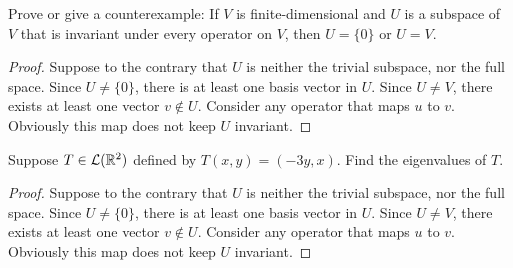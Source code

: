 \begin{problem}{4}
Prove or give a counterexample: If $V$ is finite-dimensional and $U$ is a subspace of $V$ that is invariant under every
operator on $V$, then $U = \{0\}$ or $U = V$.
\end{problem}
\begin{proof}
Suppose to the contrary that $U$ is neither the trivial subspace, nor the full space. Since $U \neq \{0\}$, there is at 
least one basis vector in $U$. Since $U \neq V$, there exists at least one vector $v \notin U$. Consider any operator that 
maps $u$ to $v$. Obviously this map does not keep $U$ invariant. 
\end{proof}

\begin{problem}{5}
Suppose $T\in\mathcal{L}(\mathbb{R}^2)$ defined by $T(x, y) = (-3y, x)$. Find the eigenvalues of $T$.
\end{problem}
\begin{proof}
Suppose to the contrary that $U$ is neither the trivial subspace, nor the full space. Since $U \neq \{0\}$, there is at 
least one basis vector in $U$. Since $U \neq V$, there exists at least one vector $v \notin U$. Consider any operator that 
maps $u$ to $v$. Obviously this map does not keep $U$ invariant. 
\end{proof}
